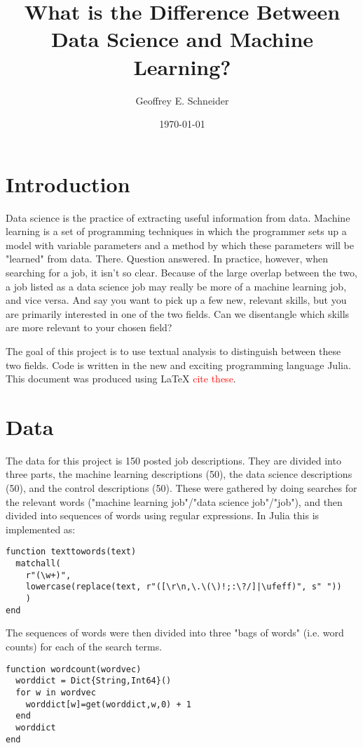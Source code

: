 \documentclass[12pt]{article}
\title{What is the Difference Between Data Science and Machine Learning?}
\date{\today}
\author{Geoffrey E. Schneider}
\newcommand{\ednote}[1]{\textcolor{red}{#1}}
\begin{document}
\maketitle
\section{Introduction} Data science is the practice of extracting useful information from data. Machine learning is a set of programming techniques in which the programmer sets up a model with variable parameters and a method by which these parameters will be "learned" from data. There. Question answered. In practice, however, when searching for a job, it isn't so clear. Because of the large overlap between the two, a job listed as a data science job may really be more of a machine learning job, and vice versa. And say you want to pick up a few new, relevant skills, but you are primarily interested in one of the two fields. Can we disentangle which skills are more relevant to your chosen field?

The goal of this project is to use textual analysis to distinguish between these two fields. Code is written in the new and exciting programming language Julia. This document was produced using LaTeX \ednote{cite these}.

\section{Data} The data for this project is 150 posted job descriptions. They are divided into three parts, the machine learning descriptions (50), the data science descriptions (50), and the control descriptions (50). These were gathered by doing searches for the relevant words ("machine learning job"/"data science job"/"job"), and then divided into sequences of words using regular expressions. In Julia this is implemented as:

\begin{verbatim} 
function texttowords(text)
  matchall(
    r"(\w+)",
    lowercase(replace(text, r"([\r\n,\.\(\)!;:\?/]|\ufeff)", s" "))
    )
end
\end{verbatim}

The sequences of words were then divided into three "bags of words" (i.e. word counts) for each of the search terms.

\begin{verbatim}
function wordcount(wordvec)
  worddict = Dict{String,Int64}()
  for w in wordvec
    worddict[w]=get(worddict,w,0) + 1
  end
  worddict
end
\end{verbatim} 
\end{document}
